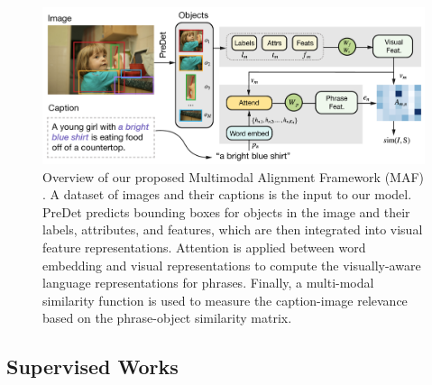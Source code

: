 \begin{figure}
  \centering
  \includegraphics[width=.8\textwidth]{figures/maf-model.png}
  \caption[Multimodal Alignment Framework model overview]{Overview
  of our proposed Multimodal Alignment Framework (MAF)
  \cite{wang2020maf}. A dataset of images and their captions is the
  input to our model. PreDet predicts bounding boxes for objects in
  the image and their labels, attributes, and features, which are
  then integrated into visual feature representations. Attention is
  applied between word embedding and visual representations to
  compute the visually-aware language representations for phrases.
  Finally, a multi-modal similarity function is used to measure the
  caption-image relevance based on the phrase-object similarity
  matrix.}
  \label{fig:maf-model}
\end{figure}

\subsection{Supervised Works}

